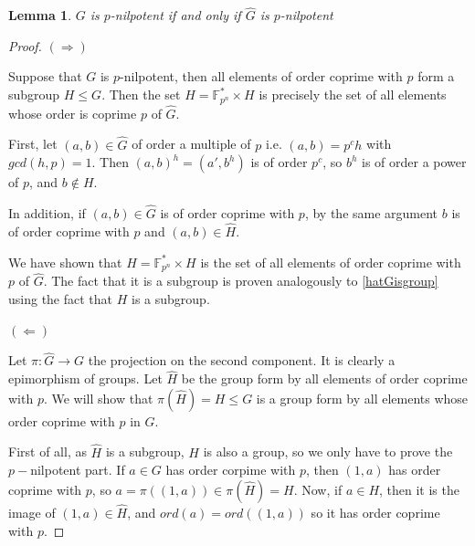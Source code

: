 \documentclass{article}
\newtheorem{lemma}[theorem]{Lemma}
\begin{document}
\begin{lemma}
    $G$ is $p$-nilpotent if and only if $\hat{G}$ is  $p$-nilpotent
\end{lemma}
\begin{proof}
$(\Longrightarrow)$

    Suppose that $G$ is $p$-nilpotent, then all elements of order coprime with $p$ form a subgroup $H\leq G$. Then the set $\hat{H}=\mathbb{F}_{p^n}^* \times H$ is precisely the set of all elements whose order is coprime $p$ of $\hat{G}$.


    First, let $(a,b)\in \hat{G}$ of order a multiple of $p$ i.e. $(a,b) = p^c h$ with $gcd(h,p)=1$. Then $(a,b)^h = (a',b^h)$ is of order $p^c$, so $b^h$ is of order a power of $p$, and $b\not \in H$.

    In addition, if $(a,b) \in \hat{G}$ is of order coprime with $p$, by the same argument $b$ is of order coprime with $p$ and $(a,b) \in \hat{H}$.
    

    We have shown that $\hat{H}=\mathbb{F}_{p^n}^* \times H$ is the set of all elements of order coprime with $p$ of $\hat{G}$. The fact that it is a subgroup is proven analogously to \ref{hatGisgroup} using the fact that $H$ is a subgroup.

    $(\Longleftarrow)$

    Let $\pi : \hat{G} \longrightarrow G$ the projection on the second component. It is clearly a epimorphism of groups. Let $\hat{H}$  be the group form by all elements of order coprime with $p$. We will show that $\pi(\hat{H}) = H\leq G$ is a group form by all elements whose order coprime with $p$ in $G$. 
    
    First of all, as $\hat{H}$ is a subgroup, $H$ is also a group, so we only have to prove the $p-$nilpotent part. If $a\in G$ has order corpime with $p$, then $(1,a)$ has order coprime with $p$, so $a = \pi((1,a))  \in \pi(\hat{H}) = H$. Now, if $a\in H$, then it is the image of $(1,a) \in \hat{H}$, and $ord(a) = ord((1,a))$ so it has order coprime with $p$. 
\end{proof}
\end{document}
